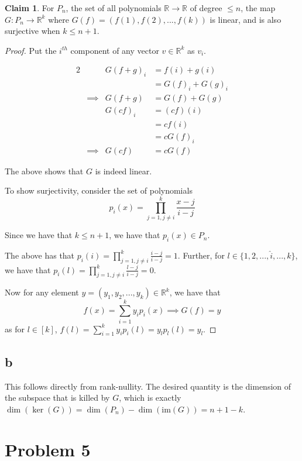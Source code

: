 \documentclass[12pt,letterpaper]{article}
\theoremstyle{definition}
\newtheorem*{claim}{Claim}
\newcommand{\R}{\mathbb{R}}
\newcommand{\im}{\mathrm{im}}
\begin{document}
\begin{claim}
  For $P_n$, the set of all polynomials $\R \rightarrow \R$ of degree $\leq n$,
  the map $G: P_n \rightarrow \R^k$ where $G(f) = (f(1), f(2), ..., f(k))$ is linear, and is also
  surjective when $k \leq n + 1$.
\end{claim}

\begin{proof}
  Put the $i^{th}$ component of any vector $v \in \R^k$ as $v_i$.
  
  \begin{alignat*}{2}
    && G(f + g)_{i} &= f(i) + g(i) \\
    && &= G(f)_i + G(g)_{i} \\
    &\implies& G(f + g) &= G(f) + G(g) \\
    && G(cf)_i &= (cf)(i) \\
    && &= cf(i) \\
    && &= cG(f)_i \\
    &\implies& G(cf) &= cG(f)
  \end{alignat*}

  The above shows that $G$ is indeed linear.

  To show surjectivity, consider the set of polynomials
  \[
    p_i(x) = \prod_{j=1, j \neq i}^k\frac{x - j}{i - j} 
  \]
  
  Since we have that $k \leq n + 1$, we have that $p_i(x) \in P_n$.

  The above has that $p_i(i) = \prod_{j=1, j \neq i}^k\frac{i - j}{i - j} = 1$. 
  Further, for $l \in \{1, 2, ..., \hat{i}, ..., k\}$, we have that $p_i(l) =
  \prod_{j=1, j\neq i}^k\frac{l - j}{i - j} = 0$.
  
  Now for any element $y = (y_1, y_2, ..., y_k) \in \R^k$, we have that
  \[
    f(x) = \sum_{i=1}^ky_ip_i(x) \implies G(f) = y
  \]
  as for $l \in [k]$, $f(l) = \sum_{i=1}^ky_ip_i(l) = y_lp_l(l) = y_l$.
\end{proof}

\subsection*{b}

This follows directly from rank-nullity. The desired quantity is the dimension
of the subspace that is killed by $G$, which is exactly $\dim(\ker(G)) =
\dim(P_n) - \dim(\im(G)) = n + 1 - k$.

\section*{Problem 5}
\end{document}
